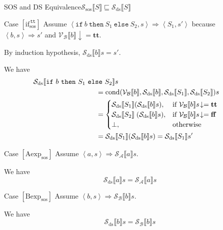 \documentclass{beamer}
\newcommand{\ifelse}[3]{\mathtt{if}\ #1\ \mathtt{then}\ #2\ \mathtt{else}\ #3}
\newcommand{\sem}[2]{\mathcal{#1} \llbracket #2 \rrbracket}
\newcommand{\tr}{\mathbf{tt}}
\newcommand{\ff}{\mathbf{ff}}
\newcommand{\defined}{\!\downarrow}
\begin{document}
\begin{frame}{SOS and DS Equivalence}{$\sem{S_\mathrm{sos}}{S} \sqsubseteq \sem{S_\mathrm{ds}}{S}$}
\begin{overprint}
        \begin{block}{Case $[\mbox{if}^{\mathtt{\,tt}}_{\mathrm{sos}}]$}
            Assume $\left< \ifelse{b}{S_1}{S_2}, s \right> \Rightarrow \left< S_1, s' \right>$
            because $\left< b, s \right> \Rightarrow s'$ and $\sem{V_B}{b} \defined = \tr$.
            \medskip

            By induction hypothesis, $\sem{S_\mathrm{ds}}{b}s = s'$.
            \medskip

            We have
            \begin{equation*}
                \begin{multlined}[][0.8\textwidth]
                    \sem{S_{\mathrm{ds}}}{\ifelse{b}{S_1}{S_2}}s \\
                    \begin{aligned}
                         & = \mathrm{cond}(\sem{V_B}{b}, \sem{S_\mathrm{ds}}{b}, \sem{S_{\mathrm{ds}}}{S_1}, \sem{S_{\mathrm{ds}}}{S_2})s          \\
                         & =
                        \begin{cases}
                            \sem{S_{\mathrm{ds}}}{S_1}(\sem{S_\mathrm{ds}}{b}s),   & \mbox{if } \sem{V_B}{b}s\defined = \tr \\
                            \sem{S_{\mathrm{ds}}}{S_2}\;(\sem{S_\mathrm{ds}}{b}s), & \mbox{if } \sem{V_B}{b}s\defined = \ff \\
                            \bot,                                                  & \mbox{otherwise}
                        \end{cases} \\
                         & = \sem{S_{\mathrm{ds}}}{S_1}(\sem{S_\mathrm{ds}}{b}s)
                        = \sem{S_{\mathrm{ds}}}{S_1}s'
                    \end{aligned}
                \end{multlined}
            \end{equation*}
        \end{block}

        \begin{block}{Case $[\mbox{Aexp}_{\mathrm{sos}}]$}
            Assume $\left< a, s \right> \Rightarrow \sem{S_A}{a}s$.
            \medskip

            We have
            $$\sem{S_{\mathrm{ds}}}{a}s = \sem{S_A}{a}s$$
        \end{block}
        \begin{block}{Case $[\mbox{Bexp}_{\mathrm{sos}}]$}
            Assume $\left< b, s \right> \Rightarrow \sem{S_B}{b}s$.
            \medskip

            We have
            $$\sem{S_{\mathrm{ds}}}{b}s = \sem{S_B}{b}s$$
        \end{block}
    \end{overprint}

\end{frame}
\end{document}
